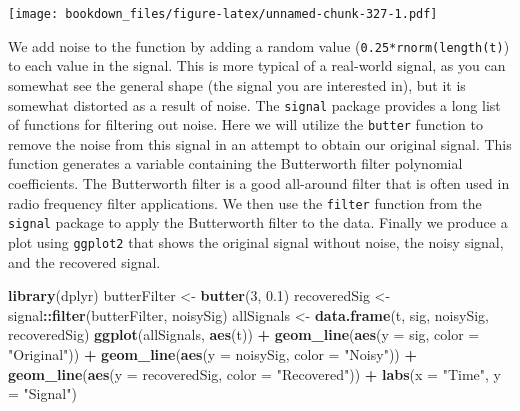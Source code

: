 \documentclass[
]{krantz}
\makeatletter
\newenvironment{Shaded}{\begin{snugshade}}{\end{snugshade}}
\newcommand{\DataTypeTok}[1]{\textcolor[rgb]{0.27,0.27,0.27}{#1}}
\newcommand{\DecValTok}[1]{\textcolor[rgb]{0.06,0.06,0.06}{#1}}
\newcommand{\FloatTok}[1]{\textcolor[rgb]{0.06,0.06,0.06}{#1}}
\newcommand{\KeywordTok}[1]{\textcolor[rgb]{0.27,0.27,0.27}{\textbf{#1}}}
\newcommand{\NormalTok}[1]{#1}
\newcommand{\OperatorTok}[1]{\textcolor[rgb]{0.43,0.43,0.43}{\textbf{#1}}}
\newcommand{\StringTok}[1]{\textcolor[rgb]{0.5,0.5,0.5}{#1}}
\newenvironment{kframe}{%
\medskip{}
\setlength{\fboxsep}{.8em}
 \def\at@end@of@kframe{}%
 \ifinner\ifhmode%
  \def\at@end@of@kframe{\end{minipage}}%
  \begin{minipage}{\columnwidth}%
 \fi\fi%
 \def\FrameCommand##1{\hskip\@totalleftmargin \hskip-\fboxsep
 \colorbox{shadecolor}{##1}\hskip-\fboxsep
     \hskip-\linewidth \hskip-\@totalleftmargin \hskip\columnwidth}%
 \MakeFramed {\advance\hsize-\width
   \@totalleftmargin\z@ \linewidth\hsize
   \@setminipage}}%
 {\par\unskip\endMakeFramed%
 \at@end@of@kframe}
\renewenvironment{Shaded}{\begin{kframe}}{\end{kframe}}
\makeatother
\begin{document}
\texttt{[image: bookdown\_files/figure-latex/unnamed-chunk-327-1.pdf]}

We add noise to the function by adding a random value (\texttt{0.25*rnorm(length(t)}) to each value in the signal. This is more typical of a real-world signal, as you can somewhat see the general shape (the signal you are interested in), but it is somewhat distorted as a result of noise. The \texttt{signal} package provides a long list of functions for filtering out noise. Here we will utilize the \texttt{butter} function to remove the noise from this signal in an attempt to obtain our original signal. This function generates a variable containing the Butterworth filter polynomial coefficients. The Butterworth filter is a good all-around filter that is often used in radio frequency filter applications. We then use the \texttt{filter} function from the \texttt{signal} package to apply the Butterworth filter to the data. Finally we produce a plot using \texttt{ggplot2} that shows the original signal without noise, the noisy signal, and the recovered signal.

\begin{Shaded}
\begin{Highlighting}[]
\KeywordTok{library}\NormalTok{(dplyr)}
\NormalTok{butterFilter \textless{}{-}}\StringTok{ }\KeywordTok{butter}\NormalTok{(}\DecValTok{3}\NormalTok{, }\FloatTok{0.1}\NormalTok{)}
\NormalTok{recoveredSig \textless{}{-}}\StringTok{ }\NormalTok{signal}\OperatorTok{::}\KeywordTok{filter}\NormalTok{(butterFilter, noisySig)}
\NormalTok{allSignals \textless{}{-}}\StringTok{ }\KeywordTok{data.frame}\NormalTok{(t, sig, noisySig, recoveredSig)}
\KeywordTok{ggplot}\NormalTok{(allSignals, }\KeywordTok{aes}\NormalTok{(t)) }\OperatorTok{+}\StringTok{ }
\StringTok{  }\KeywordTok{geom\_line}\NormalTok{(}\KeywordTok{aes}\NormalTok{(}\DataTypeTok{y =}\NormalTok{ sig, }\DataTypeTok{color =} \StringTok{"Original"}\NormalTok{)) }\OperatorTok{+}\StringTok{ }
\StringTok{  }\KeywordTok{geom\_line}\NormalTok{(}\KeywordTok{aes}\NormalTok{(}\DataTypeTok{y =}\NormalTok{ noisySig, }\DataTypeTok{color =} \StringTok{"Noisy"}\NormalTok{)) }\OperatorTok{+}\StringTok{ }
\StringTok{  }\KeywordTok{geom\_line}\NormalTok{(}\KeywordTok{aes}\NormalTok{(}\DataTypeTok{y =}\NormalTok{ recoveredSig, }\DataTypeTok{color =} \StringTok{"Recovered"}\NormalTok{)) }\OperatorTok{+}\StringTok{ }
\StringTok{  }\KeywordTok{labs}\NormalTok{(}\DataTypeTok{x =} \StringTok{"Time"}\NormalTok{, }\DataTypeTok{y =} \StringTok{"Signal"}\NormalTok{)}
\end{Highlighting}
\end{Shaded}
\end{document}
